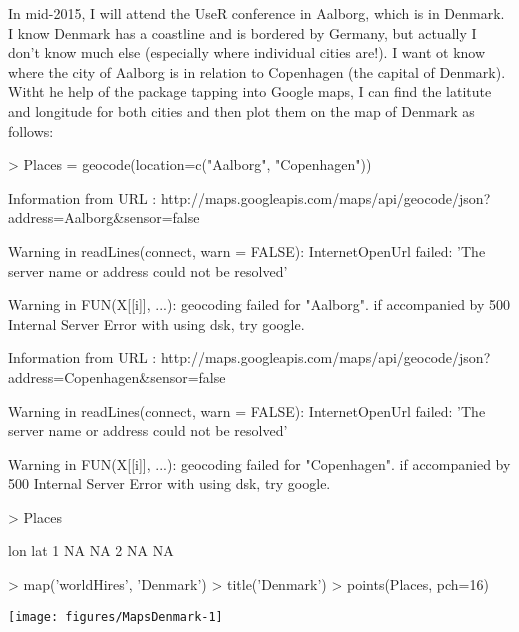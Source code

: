 In mid-2015, I will attend the UseR conference in Aalborg, which is in Denmark. I know Denmark has a coastline and is bordered by Germany, but actually I don't know much else (especially where individual cities are!). I want ot know where the city of Aalborg is in relation to Copenhagen (the capital of Denmark). Witht he help of the  package tapping into Google maps, I can find the latitute and longitude for both cities and then plot them on the map of Denmark as follows: 
\begin{Schunk}
\begin{Sinput}
> Places = geocode(location=c("Aalborg", "Copenhagen")) 
\end{Sinput}
\begin{Soutput}
Information from URL : http://maps.googleapis.com/maps/api/geocode/json?address=Aalborg&sensor=false
\end{Soutput}
\begin{Soutput}
Warning in readLines(connect, warn = FALSE): InternetOpenUrl failed: 'The server name or address could not be resolved'
\end{Soutput}
\begin{Soutput}
Warning in FUN(X[[i]], ...):   geocoding failed for "Aalborg".
  if accompanied by 500 Internal Server Error with using dsk, try google.
\end{Soutput}
\begin{Soutput}
Information from URL : http://maps.googleapis.com/maps/api/geocode/json?address=Copenhagen&sensor=false
\end{Soutput}
\begin{Soutput}
Warning in readLines(connect, warn = FALSE): InternetOpenUrl failed: 'The server name or address could not be resolved'
\end{Soutput}
\begin{Soutput}
Warning in FUN(X[[i]], ...):   geocoding failed for "Copenhagen".
  if accompanied by 500 Internal Server Error with using dsk, try google.
\end{Soutput}
\begin{Sinput}
> Places 
\end{Sinput}
\begin{Soutput}
  lon lat
1  NA  NA
2  NA  NA
\end{Soutput}
\begin{Sinput}
> map('worldHires', 'Denmark') 
> title('Denmark') 
> points(Places, pch=16) 
\end{Sinput}

\texttt{[image: figures/MapsDenmark-1]} \end{Schunk}
 
 


